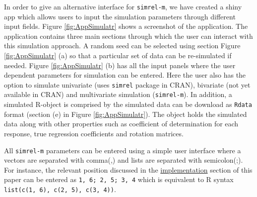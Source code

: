 \documentclass[num-refs]{wiley-article}
\begin{document}
In order to give an alternative interface for \texttt{simrel-m}, we have
created a shiny app which allows users to input the simulation
parameters through different input fields. Figure \ref{fig:AppSimulatr}
shows a screenshot of the application. The application contains three
main sections through which the user can interact with this simulation
approach. A random seed can be selected using section Figure
\ref{fig:AppSimulatr} (a) so that a particular set of data can be
re-simulated if needed. Figure \ref{fig:AppSimulatr} (b) has all the
input panels where the user dependent parameters for simulation can be
entered. Here the user also has the option to simulate univariate (uses
\texttt{simrel} package in CRAN), bivariate (not yet available in CRAN)
and multivariate simulation (\texttt{simrel-m}). In addition, a
simulated R-object is comprised by the simulated data can be download as
\texttt{Rdata} format (section (e) in Figure \ref{fig:AppSimulatr}). The
object holds the simulated data along with other properties such as
coefficient of determination for each response, true regression
coefficients and rotation matrices.

All \texttt{simrel-m} parameters can be entered using a simple user
interface where a vectors are separated with comma(,) and lists are
separated with semicolon(;). For instance, the relevant position
discussed in the \protect\hyperlink{implementation}{implementation}
section of this paper can be entered as \texttt{1,\ 6;\ 2,\ 5;\ 3,\ 4}
which is equivalent to R syntax
\texttt{list(c(1,\ 6),\ c(2,\ 5),\ c(3,\ 4))}.
\end{document}
